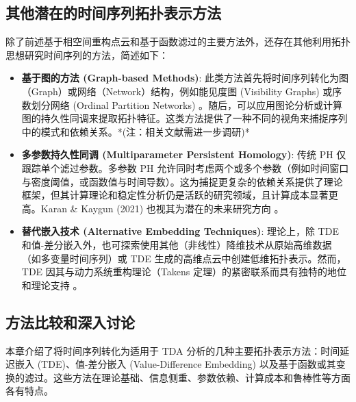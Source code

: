 \subsection{其他潜在的时间序列拓扑表示方法}
\label{sec:other_topo_repr}
除了前述基于相空间重构点云和基于函数滤过的主要方法外，还存在其他利用拓扑思想研究时间序列的方法，简述如下：
\begin{itemize}
    \item \textbf{基于图的方法 (Graph-based Methods)}: 此类方法首先将时间序列转化为图（Graph）或网络（Network）结构，例如能见度图 (Visibility Graphs) \cite{Lacasa2008VG} 或序数划分网络 (Ordinal Partition Networks) \cite{McCullough2017OPN}。随后，可以应用图论分析或计算图的持久性同调来提取拓扑特征。这类方法提供了一种不同的视角来捕捉序列中的模式和依赖关系。*(注：相关文献需进一步调研)*
    \item \textbf{多参数持久性同调 (Multiparameter Persistent Homology)}: 传统 PH 仅跟踪单个滤过参数。多参数 PH 允许同时考虑两个或多个参数（例如时间窗口与密度阈值，或函数值与时间导数）。这为捕捉更复杂的依赖关系提供了理论框架，但其计算理论和稳定性分析仍是活跃的研究领域，且计算成本显著更高。Karan \& Kaygun (2021) 也视其为潜在的未来研究方向 \cite{Karan2021TSClassificationViaTDA}。
    \item \textbf{替代嵌入技术 (Alternative Embedding Techniques)}: 理论上，除 TDE 和值-差分嵌入外，也可探索使用其他（非线性）降维技术从原始高维数据（如多变量时间序列）或 TDE 生成的高维点云中创建低维拓扑表示。然而，TDE 因其与动力系统重构理论（Takens 定理）的紧密联系而具有独特的地位和理论支持 \cite{Takens1981DetectingStrangeAttractors}。
\end{itemize}


\subsection{方法比较和深入讨论}
\label{sec:repr_comparison}
本章介绍了将时间序列转化为适用于 TDA 分析的几种主要拓扑表示方法：时间延迟嵌入 (TDE)、值-差分嵌入 (Value-Difference Embedding) 以及基于函数或其变换的滤过。这些方法在理论基础、信息侧重、参数依赖、计算成本和鲁棒性等方面各有特点。

